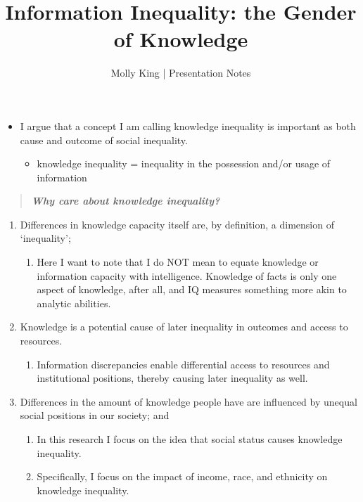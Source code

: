 \documentclass[]{article}
\begin{document}
 \title{\vspace{-1.0cm}Information Inequality: the Gender of Knowledge}
 \date{}
 \author{Molly King  |  Presentation Notes}

 \maketitle

\begin{itemize}
  \item{I argue that a concept I am calling knowledge inequality is important as both cause and outcome of social inequality.}
    \begin{itemize}
      \item{knowledge inequality = inequality in the possession and/or usage of information}
    \end{itemize}
\end{itemize}



\begin{quote}
  \emph{\textbf{Why care about knowledge inequality?}}
\end{quote}




\begin{enumerate}
  \item{Differences in knowledge capacity itself are, by definition, a dimension of `inequality';}
    \begin{enumerate}
      \item{Here I want to note that I do NOT mean to equate knowledge or information capacity with intelligence. Knowledge of facts is only one aspect of knowledge, after all, and IQ measures something more akin to analytic abilities.}
    \end{enumerate}

  \item{Knowledge is a potential cause of later inequality in outcomes and access to resources.}
    \begin{enumerate}
      \item{Information discrepancies enable differential access to resources and institutional positions, thereby causing later inequality as well.}
    \end{enumerate}

  \item{Differences in the amount of knowledge people have are influenced by unequal social positions in our society; and}
    \begin{enumerate}
      \item{In this research I focus on the idea that social status causes knowledge inequality.}
      \item{Specifically, I focus on the impact of income, race, and ethnicity on knowledge inequality.}
    \end{enumerate}
\end{enumerate}
\end{document}
